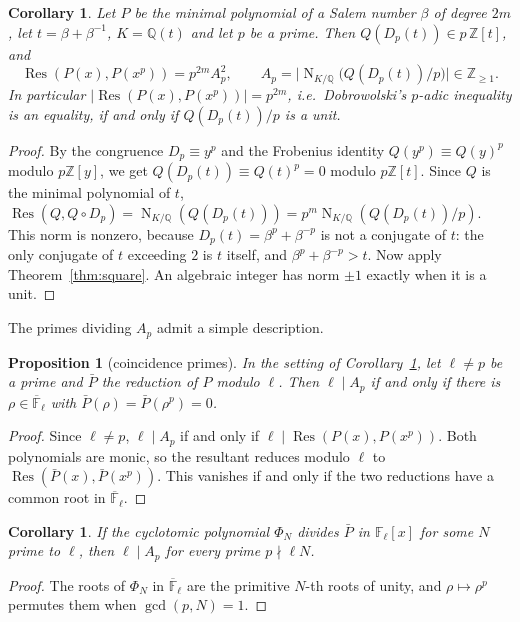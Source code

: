 \documentclass[11pt]{amsart}
\newtheorem{proposition}[theorem]{Proposition}
\newtheorem{corollary}[theorem]{Corollary}
\theoremstyle{definition}
\theoremstyle{remark}
\DeclareMathOperator{\Res}{Res}
\DeclareMathOperator{\Nm}{N}
\newcommand{\Z}{\mathbb Z}
\newcommand{\Q}{\mathbb Q}
\newcommand{\F}{\mathbb F}
\begin{document}
\begin{corollary}\label{cor:unit}
Let $P$ be the minimal polynomial of a Salem number $\beta$ of degree $2m$, let $t=\beta+\beta^{-1}$, $K=\Q(t)$ and let $p$ be a prime. Then $Q(D_p(t))\in p\,\Z[t]$, and
\[
\Res(P(x),P(x^p))=p^{2m}A_p^2,\qquad A_p=\big|\Nm_{K/\Q}\big(Q(D_p(t))/p\big)\big|\in\Z_{\ge1}.
\]
In particular $|\Res(P(x),P(x^p))|=p^{2m}$, i.e.\ Dobrowolski's $p$-adic inequality is an equality, if and only if $Q(D_p(t))/p$ is a unit.
\end{corollary}
\begin{proof}
By the congruence $D_p\equiv y^p$ and the Frobenius identity $Q(y^p)\equiv Q(y)^p$ modulo $p\Z[y]$, we get $Q(D_p(t))\equiv Q(t)^p=0$ modulo $p\Z[t]$. Since $Q$ is the minimal polynomial of $t$, $\Res(Q,Q\circ D_p)=\Nm_{K/\Q}(Q(D_p(t)))=p^m\Nm_{K/\Q}(Q(D_p(t))/p)$. This norm is nonzero, because $D_p(t)=\beta^p+\beta^{-p}$ is not a conjugate of $t$: the only conjugate of $t$ exceeding $2$ is $t$ itself, and $\beta^p+\beta^{-p}>t$. Now apply Theorem~\ref{thm:square}. An algebraic integer has norm $\pm1$ exactly when it is a unit.
\end{proof}

The primes dividing $A_p$ admit a simple description.

\begin{proposition}[coincidence primes]\label{prop:coinc}
In the setting of Corollary~\ref{cor:unit}, let $\ell\neq p$ be a prime and $\bar P$ the reduction of $P$ modulo $\ell$. Then $\ell\mid A_p$ if and only if there is $\rho\in\overline{\F}_\ell$ with $\bar P(\rho)=\bar P(\rho^p)=0$.
\end{proposition}
\begin{proof}
Since $\ell\neq p$, $\ell\mid A_p$ if and only if $\ell\mid\Res(P(x),P(x^p))$. Both polynomials are monic, so the resultant reduces modulo $\ell$ to $\Res(\bar P(x),\bar P(x^p))$. This vanishes if and only if the two reductions have a common root in $\overline{\F}_\ell$.
\end{proof}

\begin{corollary}\label{cor:cyclo}
If the cyclotomic polynomial $\Phi_N$ divides $\bar P$ in $\F_\ell[x]$ for some $N$ prime to $\ell$, then $\ell\mid A_p$ for every prime $p\nmid \ell N$.
\end{corollary}
\begin{proof}
The roots of $\Phi_N$ in $\overline{\F}_\ell$ are the primitive $N$-th roots of unity, and $\rho\mapsto\rho^p$ permutes them when $\gcd(p,N)=1$.
\end{proof}
\end{document}
